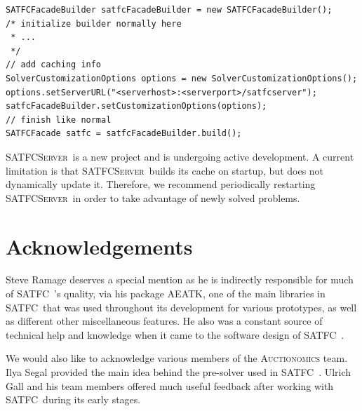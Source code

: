 \documentclass[
10pt, %
letterpaper, %
oneside, %
headinclude,footinclude, %
BCOR5mm, %
needspace, %
]{scrartcl}
\newcommand{\SATFC}{\textsc{SATFC}~}
\newcommand{\SATFCServer}{\textsc{SATFCServer}~}
\newcommand{\AEATK}{\textsc{AEATK}}
\begin{document}
\begin{verbatim}
SATFCFacadeBuilder satfcFacadeBuilder = new SATFCFacadeBuilder();
/* initialize builder normally here
 * ...
 */
// add caching info
SolverCustomizationOptions options = new SolverCustomizationOptions();
options.setServerURL("<serverhost>:<serverport>/satfcserver");
satfcFacadeBuilder.setCustomizationOptions(options);
// finish like normal
SATFCFacade satfc = satfcFacadeBuilder.build();
\end{verbatim}


\begin{fwarning}
	\SATFCServer is a new project and is undergoing active development. A current limitation is that \SATFCServer builds its cache on startup, but does not dynamically update it. Therefore, we recommend periodically restarting \SATFCServer in order to take advantage of newly solved problems.
\end{fwarning}


\section{Acknowledgements} 

Steve Ramage deserves a special mention as he is indirectly responsible for much of \SATFC's quality, via his package \AEATK, one of the main libraries in \SATFC that was used throughout its development for various prototypes, as well as different other miscellaneous features. He also was a constant source of technical help and knowledge when it came to the software design of \SATFC.

We would also like to acknowledge various members of the \textsc{Auctionomics} team. Ilya Segal provided the main idea behind the pre-solver used in \SATFC. Ulrich Gall and his team members offered much useful feedback after working with \SATFC during its early stages.
\end{document}
